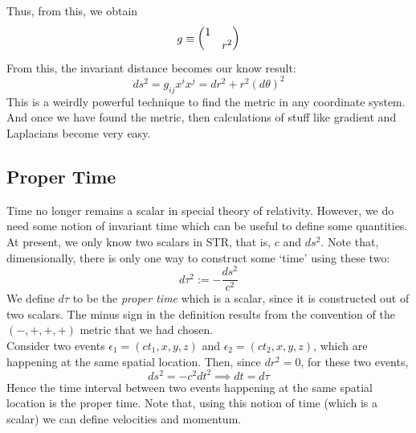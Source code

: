 Thus, from this, we obtain 
$$g \equiv \mqty(\dmat{1,r^2})$$
From this, the invariant distance becomes our know result:
$$ds^2 = g_{ij}x^i x^j = dr^2 + r^2 (d\theta)^2$$
This is a weirdly powerful technique to find the metric in any coordinate system. And once we have found the metric, then calculations of stuff like gradient and Laplacians become very easy. \\[0.2cm]
\subsection{Proper Time}
Time no longer remains a scalar in special theory of relativity. However, we do need some notion of invariant time which can be useful to define some quantities. At present, we only know two scalars in STR, that is, $c$ and $ds^2$. Note that, dimensionally, there is only one way to construct some `time' using these two:
$$d\tau^2 := -\frac{ds^2}{c^2}$$
We define $d\tau$ to be the \textit{proper time} which is a scalar, since it is constructed out of two scalars. The minus sign in the definition results from the convention of the $(-,+,+,+)$ metric that we had chosen. \\[0.2cm]
Consider two events $\epsilon_1 = (ct_1, x,y,z)$ and $\epsilon_2 = (ct_2, x,y,z)$, which are happening at the same spatial location. Then, since $dr^2=0$, for these two events, $$ds^2 = -c^2dt^2 \implies dt =d\tau$$
Hence the time interval between two events happening at the same spatial location is the proper time. Note that, using this notion of time (which is a scalar) we can define velocities and momentum. 
